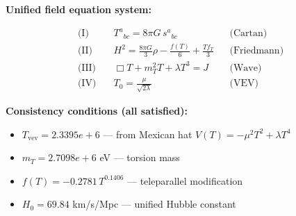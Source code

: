 
\textbf{Unified field equation system:}

\begin{align}
  \text{(I)} \quad & T^a{}_{bc} = 8\pi G \, s^a{}_{bc} && \text{(Cartan)} \\
  \text{(II)} \quad & H^2 = \frac{8\pi G}{3}\rho - \frac{f(T)}{6} + \frac{Tf_T}{3} && \text{(Friedmann)} \\
  \text{(III)} \quad & \Box T + m_T^2 T + \lambda T^3 = J && \text{(Wave)} \\
  \text{(IV)} \quad & T_0 = \frac{\mu}{\sqrt{2\lambda}} && \text{(VEV)}
\end{align}

\textbf{Consistency conditions (all satisfied):}
\begin{itemize}
  \item $T_{\text{vev}} = 2.3395e+6$ — from Mexican hat $V(T) = -\mu^2 T^2 + \lambda T^4$
  \item $m_T = 2.7098e+6$ eV — torsion mass
  \item $f(T) = -0.2781 \, T^{0.1406}$ — teleparallel modification
  \item $H_0 = 69.84$ km/s/Mpc — unified Hubble constant
\end{itemize}